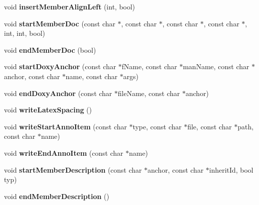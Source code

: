 \begin{DoxyCompactItemize}
void {\bfseries insert\+Member\+Align\+Left} (int, bool)
\item 
\mbox{\label{class_docbook_generator_acba8e0286d5d95bf12625b730f3b1390}} 
void {\bfseries start\+Member\+Doc} (const char $\ast$, const char $\ast$, const char $\ast$, const char $\ast$, int, int, bool)
\item 
\mbox{\label{class_docbook_generator_a7bc7a7d5287f42c03dec4aa894594d34}} 
void {\bfseries end\+Member\+Doc} (bool)
\item 
\mbox{\label{class_docbook_generator_ad77356d6c995140b4874aa673e3a5ead}} 
void {\bfseries start\+Doxy\+Anchor} (const char $\ast$f\+Name, const char $\ast$man\+Name, const char $\ast$anchor, const char $\ast$name, const char $\ast$args)
\item 
\mbox{\label{class_docbook_generator_a961ba92be55f7046321e2b424496ed61}} 
void {\bfseries end\+Doxy\+Anchor} (const char $\ast$file\+Name, const char $\ast$anchor)
\item 
\mbox{\label{class_docbook_generator_aa22b4e02bb230d1df37dcc7c8b9471e7}} 
void {\bfseries write\+Latex\+Spacing} ()
\item 
\mbox{\label{class_docbook_generator_a02e9603e70bc6ee4745928e54e53d5e7}} 
void {\bfseries write\+Start\+Anno\+Item} (const char $\ast$type, const char $\ast$file, const char $\ast$path, const char $\ast$name)
\item 
\mbox{\label{class_docbook_generator_aa58fefff6b840fffb1516fcd0cef9623}} 
void {\bfseries write\+End\+Anno\+Item} (const char $\ast$name)
\item 
\mbox{\label{class_docbook_generator_ac071f35b16b2259b954402588bc57e60}} 
void {\bfseries start\+Member\+Description} (const char $\ast$anchor, const char $\ast$inherit\+Id, bool typ)
\item 
\mbox{\label{class_docbook_generator_a9d5686c7164e32d3214351c5721f7545}} 
void {\bfseries end\+Member\+Description} ()

\end{DoxyCompactItemize}
